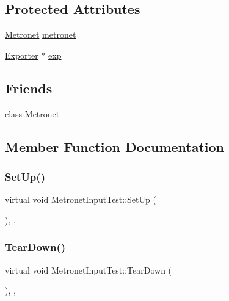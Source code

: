 \subsection*{Protected Attributes}
\begin{DoxyCompactItemize}
\item 
\hyperlink{class_metronet}{Metronet} \hyperlink{class_metronet_input_test_ab922ed7c2e4f1dfee1ed7df1eb3a13b4}{metronet}
\item 
\hyperlink{class_exporter}{Exporter} $\ast$ \hyperlink{class_metronet_input_test_ae16b3047e5801a34ef23dd9314e44770}{exp}
\end{DoxyCompactItemize}
\subsection*{Friends}
\begin{DoxyCompactItemize}
\item 
class \hyperlink{class_metronet_input_test_a07c94fb69880743e62f64a941fc2d4ab}{Metronet}
\end{DoxyCompactItemize}


\subsection{Member Function Documentation}
\mbox{\label{class_metronet_input_test_a863299908a545656568a7d534387e05d}} 
\subsubsection{\texorpdfstring{Set\+Up()}{SetUp()}}
{\footnotesize\ttfamily virtual void Metronet\+Input\+Test\+::\+Set\+Up (\begin{DoxyParamCaption}{ }\end{DoxyParamCaption})\hspace{0.3cm}{\ttfamily [inline]}, {\ttfamily [protected]}, {\ttfamily [virtual]}}

\mbox{\label{class_metronet_input_test_a20f35cb70be79eee36b1dab816cf6806}} 
\subsubsection{\texorpdfstring{Tear\+Down()}{TearDown()}}
{\footnotesize\ttfamily virtual void Metronet\+Input\+Test\+::\+Tear\+Down (\begin{DoxyParamCaption}{ }\end{DoxyParamCaption})\hspace{0.3cm}{\ttfamily [inline]}, {\ttfamily [protected]}, {\ttfamily [virtual]}}




